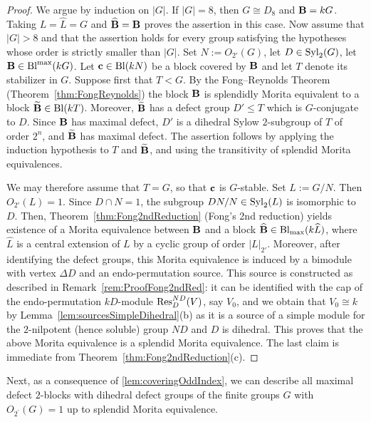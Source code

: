 \begin{proof}
We argue by induction on $|G|$. If $|G|=8$, then $G\cong D_8$ and ${\mathbf{B}}=kG$.
Taking $L=\widehat{L}=G$ and $\widehat{{\mathbf{B}}}={\mathbf{B}}$ proves
the assertion in this case.
Now assume that $|G|>8$ and that the assertion holds for every group satisfying the hypotheses whose order
is strictly smaller than $|G|$.
Set $N:=O_{2'}(G)$,  let $D\in\operatorname{Syl}_2(G)$, let ${\mathbf{B}}\in\operatorname{Bl}^{\max}(kG)$. Let ${\mathbf{c}}\in\operatorname{Bl}(kN)$ be a block covered by ${\mathbf{B}}$  and let $T$ denote its stabilizer in $G$. 
Suppose first that $T<G$.
By the Fong{--}Reynolds Theorem (Theorem~\ref{thm:FongReynolds}) the block ${\mathbf{B}}$
is splendidly Morita equivalent to a block $\widetilde{{\mathbf{B}}}\in\operatorname{Bl}(kT)$. Moreover, $\widetilde{{\mathbf{B}}}$ has a defect group $D'\leq T$
which is $G$-conjugate to $D$.
Since ${\mathbf{B}}$ has maximal defect, $D'$ is a dihedral Sylow $2$-subgroup of $T$
of order $2^n$, and $\widetilde{{\mathbf{B}}}$ has maximal defect.
The assertion follows by applying the induction
hypothesis to $T$ and $\widetilde{{\mathbf{B}}}$, and using the
transitivity of splendid Morita equivalences.

We may therefore assume that $T=G$, so that ${\mathbf{c}}$ is
$G$-stable.
Set $L:=G/N$. Then $O_{2'}(L)=1$. Since $D\cap N=1$, the subgroup $DN/N\in\operatorname{Syl}_2(L)$
is isomorphic to $D$. 
 Then, Theorem~\ref{thm:Fong2ndReduction} (Fong's 2nd reduction) yields 
existence of a Morita equivalence between ${\mathbf{B}}$ and
a block $\widehat{{\mathbf{B}}}\in\operatorname{Bl}_{\max}(k\widehat{L})$,
where $\widehat{L}$ is a central extension of $L$
by a cyclic group of order $|L|_{2'}$.
Moreover, after identifying the defect groups, this
Morita equivalence is induced by a bimodule with
vertex $\Delta D$ and an endo-permutation source.
This source is constructed as described in Remark~\ref{rem:ProofFong2ndRed}: it can be identified with the cap of the endo-permutation $kD$-module $\operatorname{Res}^{ND}_D(V)$, say $V_0$, and we obtain that $V_0\cong k$ by Lemma~\ref{lem:sourcesSimpleDihedral}(b) as it is a source of a simple module for the $2$-nilpotent (hence soluble) group $ND$ and $D$ is dihedral. This proves that the above Morita equivalence is a splendid Morita equivalence.  
The last claim is immediate from Theorem~\ref{thm:Fong2ndReduction}(c). 
\end{proof}



\noindent Next, as a consequence of \cref{lem:coveringOddIndex}, we can describe all maximal defect $2$-blocks with dihedral defect groups of the finite groups $G$ with $O_{2^{\prime}}(G)=1$ up to splendid Morita equivalence. 

